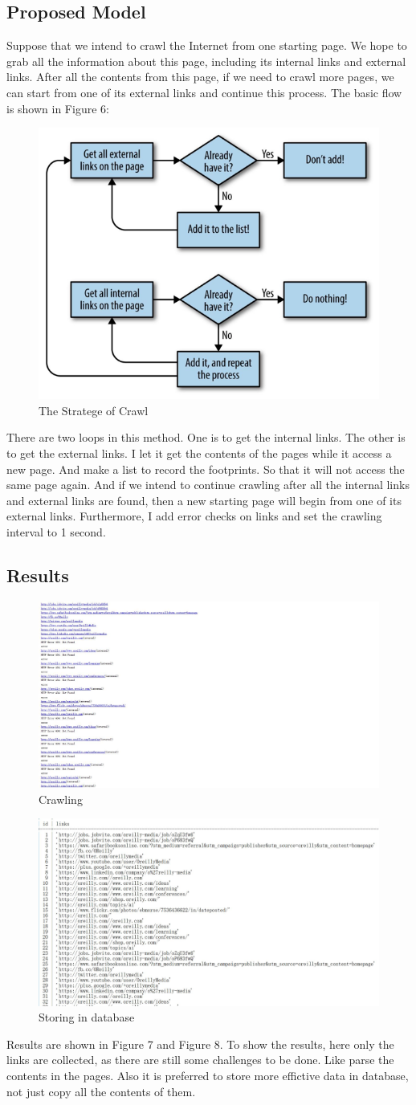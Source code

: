 \documentclass[twocolumn,10pt]{article}
\begin{document}
\subsection{Proposed Model}
Suppose that we intend to crawl the Internet from one starting page. We hope to grab all the information about this page, including its internal links and external links. After all the contents from this page, if we need to crawl more pages, we can start from one of its external links and continue this process. The basic flow is shown in Figure 6:\par
\begin{figure}
	\centering
	\includegraphics[width = .3\textwidth]{pic6.png}
	\caption{The Stratege of Crawl}
\end{figure}
There are two loops in this method. One is to get the internal links. The other is to get the external links. I let it get the contents of the pages while it access a new page. And make a list to record the footprints. So that it will not access the same page again. And if we intend to continue crawling after all the internal links and external links are found, then a new starting page will begin from one of its external links. Furthermore, I add error checks on links and set the crawling interval to 1 second.
\subsection{Results}
\begin{figure}
	\centering
	\includegraphics[width = .4\textwidth]{r3.png}
	\caption{Crawling}
\end{figure}
\begin{figure}
	\centering
	\includegraphics[width = .4\textwidth]{r2.png}
	\caption{Storing in database}
\end{figure}
Results are shown in Figure 7 and Figure 8. To show the results, here only the links are collected, as there are still some challenges to be done. Like parse the contents in the pages. Also it is preferred to store more effictive data in database, not just copy all the contents of them.
\end{document}
